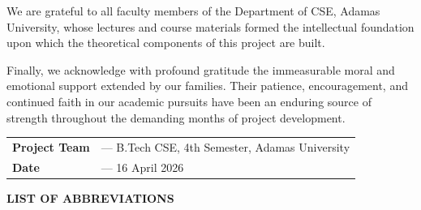\documentclass[12pt,a4paper]{report}
\begin{document}
\noindent We are grateful to all faculty members of the Department of CSE, Adamas University, whose lectures and course materials formed the intellectual foundation upon which the theoretical components of this project are built.

\vspace{10pt}

\noindent Finally, we acknowledge with profound gratitude the immeasurable moral and emotional support extended by our families. Their patience, encouragement, and continued faith in our academic pursuits have been an enduring source of strength throughout the demanding months of project development.

\vspace{28pt}

\noindent\begin{tabular}{@{}ll@{}}
  \textbf{Project Team} & --- B.Tech CSE, 4th Semester, Adamas University \\[3pt]
  \textbf{Date}         & --- 16 April 2026 \\
\end{tabular}

\clearpage
\tableofcontents

\clearpage
\listoffigures

\clearpage
\listoftables

\clearpage
\thispagestyle{plain}
\begin{center}
  {\Large\textbf{LIST OF ABBREVIATIONS}}
\end{center}
\vspace{16pt}
\end{document}
